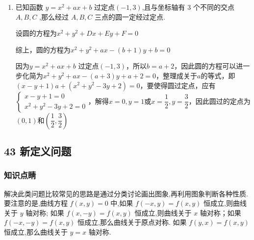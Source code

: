 \begin{enumerate}
\begin{jieda}
        两方程相减即得 ${x^2} = \dfrac{{\left( 5x + {12}y\right) }^{2}}{{13}^{2}}$ ,而结合图像可知 $A,B$ 位于 $x = 0$ 的右侧和 ${5x} + {12y} = 0$ 的上侧,
        故 $x = \dfrac{{5x} + {12y}}{13}$ ,即 $y = \dfrac{2}{3}x$ .
        故答案为: $y = \dfrac{2}{3}x$ .
    \end{jieda}
    \item 已知函数 $y = {x}^{2} + {ax} + b$ 过定点$(-1,3)$,且与坐标轴有 3 个不同的交点 $A,B,C$ ,那么经过 $A,B,C$ 三点的圆一定经过定点.
    \begin{jieda}
        设圆的方程为$x^2+y^2+Dx+Ey+F = 0$
        综上，圆的方程为$x^2+y^2+ax-(b+1)y+b = 0$

        因为$y = {x}^{2} + {ax} + b$ 过定点$(-1,3)$，所以$b = a+2$，因此圆的方程可以进一步化简为$x^2+y^2+ax-(a+3)y+a+2 = 0$，整理成关于$a$的等式，即$(x-y+1)a+(x^2+y^2-3y+2) = 0$，要使得圆过定点，应有$\left\{\begin{array}{l}
             x-y+1 = 0  \\
             x^2+y^2-3y+2 = 0 
        \end{array} \right.$，解得$x = 0, y = 1$或$x = \dfrac{1}{2}, y = \dfrac{3}{2}$，因此圆过的定点为$(0, 1)$和$\left(\dfrac{1}{2}, \dfrac{3}{2}\right)$
    \end{jieda}
\end{enumerate}

\subsection*{43 新定义问题}

\subsubsection*{知识点睛}

解决此类问题比较常见的思路是通过分类讨论画出图象,再利用图象判断各种性质. 要注意的是,曲线方程 $f\left( {x,y}\right)  = 0$ 中,如果 $f\left( {-x,y}\right)  = f\left( {x,y}\right)$ 恒成立,则曲线关于 $y$ 轴对称; 如果 $f\left( {x, - y}\right)  = f\left( {x,y}\right)$ 恒成立,则曲线关于 $x$ 轴对称；如果 $f\left( {-x, - y}\right)  = f\left( {x,y}\right)$ 恒成立,那么曲线关于原点对称. 如果 $f\left( {y,x}\right)  = f\left( {x,y}\right)$ 恒成立,那么曲线关于 $y = x$ 轴对称.

